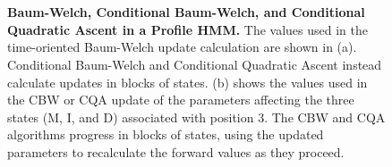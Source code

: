 \documentclass[preprint,12pt,authoryear]{elsarticle}
\begin{document}
\begin{figure}[htp]
\centering
{} \\
 \\
 \caption{\textbf{Baum-Welch, Conditional Baum-Welch, and Conditional Quadratic Ascent in a Profile HMM.}  The values used in the time-oriented Baum-Welch update calculation are shown in (a).  Conditional Baum-Welch and Conditional Quadratic Ascent instead calculate updates in blocks of states.  (b) shows the values used in the CBW or CQA update of the parameters affecting the three states (M, I, and D) associated with position 3.  The CBW and CQA algorithms progress in blocks of states, using the updated parameters to recalculate the forward values as they proceed.}
  \label{cbw_fig:BW_vs_CBW}
\end{figure}
\end{document}
